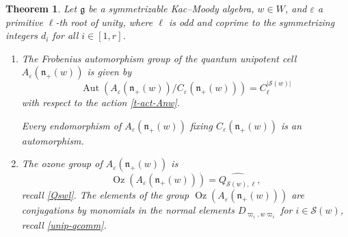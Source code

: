 \documentclass[11pt]{amsart}
\theoremstyle{plain}
\newtheorem{theorem}{Theorem}[section]
\newcommand \bth[1] { \begin{theorem}\label{t#1} }
\renewcommand {\eth} { \end{theorem} }
\def \SS {{\mathcal{S}}}
\def \vpi {\varpi}
\def \ep {\varepsilon}
\def \wh {\widehat}
\def \g  {\mathfrak{g}}   %
\def \n  {\mathfrak{n}}
\DeclareMathOperator \Aut { {\mathrm{Aut}} }
\DeclareMathOperator \Oz { {\mathrm{Oz}}}
\begin{document}
\bth{AutAnw} Let $\g$ be a symmetrizable Kac--Moody algebra, $w \in W$, and $\ep$ a primitive $\ell$-th root of unity, where $\ell$ is odd and coprime to the symmetrizing integers $d_i$ for all $i \in [1,r]$.
\begin{enumerate}
    \item[(i)] The Frobenius automorphism group of the quantum unipotent cell $A_\ep(\n_+(w))$ is given by 
\[
\Aut(A_\ep(\n_+(w))/C_\ep(\n_+(w))) = C_\ell^{|\SS(w)|}
\]
with respect to the action \eqref{t-act-Anw}.

Every endomorphism of $A_\ep(\n_+(w))$ fixing $C_\ep(\n_+(w))$ is an automorphism.
    \item[(ii)] The ozone group of $A_\ep(\n_+(w))$ is
\[
\Oz(A_\ep(\n_+(w))) = \wh{Q_{\SS(w), \ell}},
\]
recall \eqref{Qswl}.
The elements of the group $\Oz(A_\ep(\n_+(w)))$ are conjugations by monomials 
in the normal elements $D_{\vpi_i, w \vpi_i}$ for $i \in \SS(w)$, 
recall \eqref{unip-qcomm}.
\end{enumerate}
\eth
\end{document}
